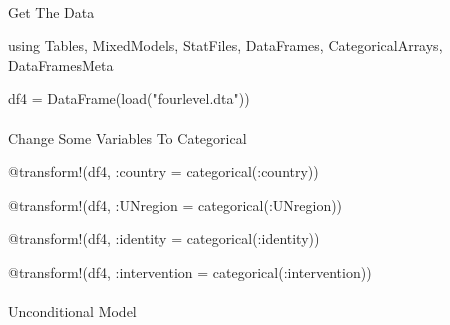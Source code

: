 \documentclass[
  letterpaper,
  DIV=11,
  numbers=noendperiod]{scrreprt}
\makeatletter
\let\oldparagraph\paragraph
\renewcommand{\paragraph}{
    \@ifstar
      \xxxParagraphStar
      \xxxParagraphNoStar
  }
\newcommand{\xxxParagraphStar}[1]{\oldparagraph*{#1}\mbox{}}
\newcommand{\xxxParagraphNoStar}[1]{\oldparagraph{#1}\mbox{}}
\newenvironment{Shaded}{\begin{snugshade}}{\end{snugshade}}
\newcommand{\BuiltInTok}[1]{\textcolor[rgb]{0.00,0.23,0.31}{#1}}
\newcommand{\FunctionTok}[1]{\textcolor[rgb]{0.28,0.35,0.67}{#1}}
\newcommand{\ImportTok}[1]{\textcolor[rgb]{0.00,0.46,0.62}{#1}}
\newcommand{\NormalTok}[1]{\textcolor[rgb]{0.00,0.23,0.31}{#1}}
\newcommand{\OperatorTok}[1]{\textcolor[rgb]{0.37,0.37,0.37}{#1}}
\newcommand{\PreprocessorTok}[1]{\textcolor[rgb]{0.68,0.00,0.00}{#1}}
\newcommand{\StringTok}[1]{\textcolor[rgb]{0.13,0.47,0.30}{#1}}
\makeatother
\begin{document}
\paragraph{Get The Data}\label{get-the-data-10}

\begin{Shaded}
\begin{Highlighting}[]
\ImportTok{using} \BuiltInTok{Tables}\NormalTok{, }\BuiltInTok{MixedModels}\NormalTok{, }\BuiltInTok{StatFiles}\NormalTok{, }\BuiltInTok{DataFrames}\NormalTok{, }\BuiltInTok{CategoricalArrays}\NormalTok{, }\BuiltInTok{DataFramesMeta}

\NormalTok{df4 }\OperatorTok{=} \FunctionTok{DataFrame}\NormalTok{(}\FunctionTok{load}\NormalTok{(}\StringTok{"fourlevel.dta"}\NormalTok{))}
\end{Highlighting}
\end{Shaded}

\paragraph{Change Some Variables To
Categorical}\label{change-some-variables-to-categorical-6}

\begin{Shaded}
\begin{Highlighting}[]
\PreprocessorTok{@transform}\NormalTok{!(df4, }\OperatorTok{:}\NormalTok{country }\OperatorTok{=} \FunctionTok{categorical}\NormalTok{(}\OperatorTok{:}\NormalTok{country))}

\PreprocessorTok{@transform}\NormalTok{!(df4, }\OperatorTok{:}\NormalTok{UNregion }\OperatorTok{=} \FunctionTok{categorical}\NormalTok{(}\OperatorTok{:}\NormalTok{UNregion))}

\PreprocessorTok{@transform}\NormalTok{!(df4, }\OperatorTok{:}\NormalTok{identity }\OperatorTok{=} \FunctionTok{categorical}\NormalTok{(}\OperatorTok{:}\NormalTok{identity))}

\PreprocessorTok{@transform}\NormalTok{!(df4, }\OperatorTok{:}\NormalTok{intervention }\OperatorTok{=} \FunctionTok{categorical}\NormalTok{(}\OperatorTok{:}\NormalTok{intervention))}
\end{Highlighting}
\end{Shaded}

\paragraph{Unconditional Model}\label{unconditional-model-2}
\end{document}
